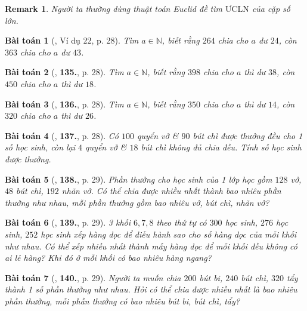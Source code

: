 \documentclass[oneside]{book}
\numberwithin{equation}{section}
\newtheorem{baitoan}{Bài toán}[section]
\newtheorem{remark}{Remark}[section]
\begin{document}
\begin{remark}
	Người ta thường dùng thuật toán Euclid đề tìm $\mbox{ƯCLN}$ của cặp số lớn.
\end{remark}

\begin{baitoan}[\cite{Binh_Toan_6_tap_1}, Ví dụ 22, p. 28]
	Tìm $a\in\mathbb{N}$, biết rằng $264$ chia cho $a$ dư $24$, còn $363$ chia cho $a$ dư $43$.
\end{baitoan}

\begin{baitoan}[\cite{Binh_Toan_6_tap_1}, \textbf{135.}, p. 28]
	Tìm $a\in\mathbb{N}$, biết rằng $398$ chia cho $a$ thì dư $38$, còn $450$ chia cho $a$ thì dư $18$.
\end{baitoan}

\begin{baitoan}[\cite{Binh_Toan_6_tap_1}, \textbf{136.}, p. 28]
	Tìm $a\in\mathbb{N}$, biết rằng $350$ chia cho $a$ thì dư $14$, còn $320$ chia cho $a$ thì dư $26$.
\end{baitoan}

\begin{baitoan}[\cite{Binh_Toan_6_tap_1}, \textbf{137.}, p. 28]
	Có $100$ quyển vở \& $90$ bút chì được thưởng đều cho 1 số học sinh, còn lại $4$ quyển vở \& $18$ bút chì không đủ chia đều. Tính số học sinh được thưởng.
\end{baitoan}

\begin{baitoan}[\cite{Binh_Toan_6_tap_1}, \textbf{138.}, p. 29]
	Phần thưởng cho học sinh của 1 lớp học gồm $128$ vở, $48$ bút chì, $192$ nhãn vở. Có thể chia được nhiều nhất thành bao nhiêu phần thưởng như nhau, mỗi phần thưởng gồm bao nhiêu vở, bút chì, nhãn vở?
\end{baitoan}

\begin{baitoan}[\cite{Binh_Toan_6_tap_1}, \textbf{139.}, p. 29]
	3 khối $6,7,8$ theo thứ tự có $300$ học sinh, $276$ học sinh, $252$ học sinh xếp hàng dọc để diễu hành sao cho số hàng dọc của mỗi khối như nhau. Có thể xếp nhiều nhất thành mấy hàng dọc để mỗi khối đều không có ai lẻ hàng? Khi đó ở mỗi khối có bao nhiêu hàng ngang?
\end{baitoan}

\begin{baitoan}[\cite{Binh_Toan_6_tap_1}, \textbf{140.}, p. 29]
	Người ta muốn chia $200$ bút bi, $240$ bút chì, $320$ tẩy thành 1 số phần thưởng như nhau. Hỏi có thể chia được nhiều nhất là bao nhiêu phần thưởng, mỗi phần thưởng có bao nhiêu bút bi, bút chì, tẩy?
\end{baitoan}
\end{document}
